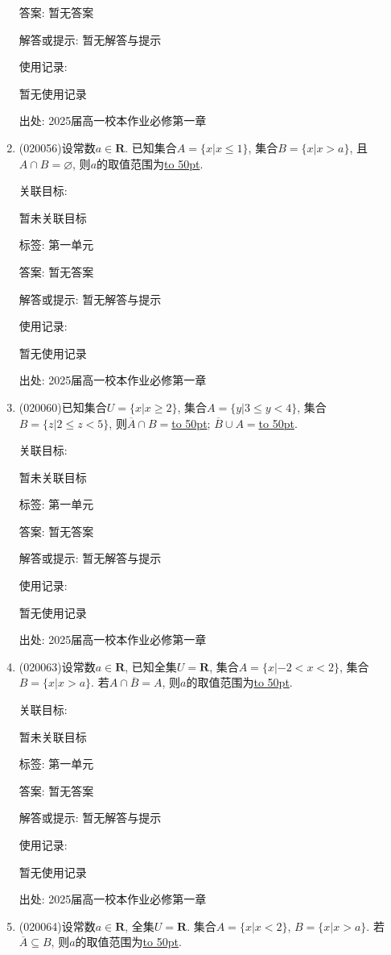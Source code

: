 \documentclass[10pt,a4paper]{article}
\newcommand{\blank}[1]{\underline{\hbox to #1pt{}}}
\begin{document}
\begin{enumerate}[1.]
答案: 暂无答案

解答或提示: 暂无解答与提示

使用记录:

暂无使用记录


出处: 2025届高一校本作业必修第一章
\item { (020056)}设常数$a\in \mathbf{R}$. 已知集合$A=\{x| x\le 1\}$, 集合$B=\{x| x>a\}$, 且$A\cap B=\varnothing$, 则$a$的取值范围为\blank{50}.


关联目标:

暂未关联目标



标签: 第一单元

答案: 暂无答案

解答或提示: 暂无解答与提示

使用记录:

暂无使用记录


出处: 2025届高一校本作业必修第一章
\item { (020060)}已知集合$U=\{x|x\ge 2\}$, 集合$A=\{y|3\le y<4\}$, 集合$B=\{z|2\le z<5\}$, 则$\overline A\cap B=$\blank{50}; $\overline B\cup A=$\blank{50}.


关联目标:

暂未关联目标



标签: 第一单元

答案: 暂无答案

解答或提示: 暂无解答与提示

使用记录:

暂无使用记录


出处: 2025届高一校本作业必修第一章
\item { (020063)}设常数$a\in \mathbf{R}$, 已知全集$U=\mathbf{R}$, 集合$A=\{x|-2<x<2\}$, 集合$B=\{x|x>a\}$. 若$A\cap\overline B=A$, 则$a$的取值范围为\blank{50}.


关联目标:

暂未关联目标



标签: 第一单元

答案: 暂无答案

解答或提示: 暂无解答与提示

使用记录:

暂无使用记录


出处: 2025届高一校本作业必修第一章
\item { (020064)}设常数$a\in \mathbf{R}$, 全集$U=\mathbf{R}$. 集合$A=\{x| x<2 \}$, $B=\{x| x>a \}$. 若$\overline A\subseteq B$, 则$a$的取值范围为\blank{50}.



\end{enumerate}
\end{document}
